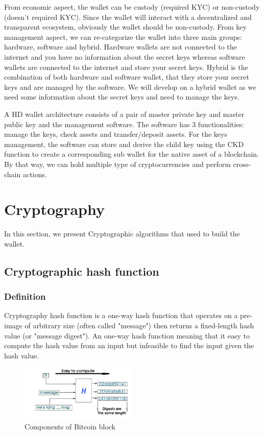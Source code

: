 From economic aspect, the wallet can be custody (required KYC) or non-custody (doesn't required KYC). Since the wallet will interact with a decentralized and transparent ecosystem, obviously the wallet should be non-custody. From key management aspect, we can re-categorize the wallet into three main groups: hardware, software and hybrid. Hardware wallets are not connected to the internet and you have no information about the secret keys whereas software wallets are connected to the internet and store your secret keys. Hybrid is the combination of both hardware and software wallet, that they store your secret keys and are managed by the software. We will develop on a hybrid wallet as we need some information about the secret keys and need to manage the keys.

A HD wallet architecture consists of a pair of master private key and master public key and the management software. The software has 3 functionalities: manage the keys, check assets and transfer/deposit assets. For the keys management, the software can store and derive the child key using the CKD function to create a corresponding sub wallet for the native asset of a blockchain. By that way, we can hold multiple type of cryptocurrencies and perform cross-chain actions.

\section{Cryptography}
In this section, we present Cryptographic algorithms that used to build the wallet.

\subsection{Cryptographic hash function}
\label{sec:crypto_hash}
\subsubsection{Definition}
Cryptography hash function is a one-way hash function that operates on a pre-image of arbitrary size (often called "message") then returns a fixed-length hash value (or "message digest").
An one-way hash function meaning that it easy to compute the hash value from an input but infeasible to find the input given the hash value.
\begin{figure}[ht!]
  \centering
  \includegraphics[width=0.5\textwidth]{images/hash_function.png}
  \caption[Components of Bitcoin block]{Components of Bitcoin block}
  \label{fig:hash_function}
\end{figure}

